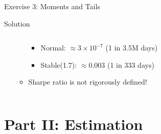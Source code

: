 \documentclass[9pt, aspectratio=169, t]{beamer}
\begin{document}
\begin{frame}{Exercise 3: Moments and Tails}
\begin{cminipage}{0.95\textwidth}
\begin{exampleblock}{Solution}
\begin{columns}[T]
\begin{column}{0.48\textwidth}
\begin{itemize}
\begin{itemize}
\begin{itemize}
            \item Normal: $\approx 3 \times 10^{-7}$ (1 in 3.5M days)
            \item Stable(1.7): $\approx 0.003$ (1 in 333 days)
        \end{itemize}
        \item Sharpe ratio is not rigorously defined!
    \end{itemize}
\end{itemize}
\end{column}
\end{columns}
\end{exampleblock}
    \end{cminipage}
\end{frame}

\section{Part II: Estimation}
\end{document}
